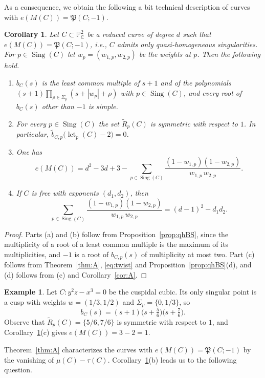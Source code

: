 \documentclass[11pt]{amsart}
\newtheorem{corollary}[theorem]{Corollary}
\theoremstyle{definition}
\newtheorem{example}[theorem]{Example}
\numberwithin{equation}{section}
\newcommand{\PP}{\mathbb{P}}
\newcommand{\CC}{\mathbb{C}}
\newcommand{\Pfrak}{\mathfrak{P}}
\newcommand{\tb}{\widetilde{b}}
\newcommand{\tR}{\widetilde{R}}
\DeclareMathOperator{\Sing}{Sing}
\DeclareMathOperator{\lct}{lct}
\begin{document}
As a consequence, we obtain the following a bit technical description of curves with $e(M(C))=\Pfrak(C;-1)$.

\begin{corollary}\label{cor:ABS}
Let $C\subset\PP^2_\CC$ be a reduced curve of degree $d$ such that $e(M(C))=\Pfrak(C;-1)$, i.e., $C$ admits only quasi-homogeneous singularities.
For $p\in\Sing(C)$ let $w_p=(w_{1,p},w_{2,p})$ be the weights at $p$. Then the following hold.
\begin{enumerate}[label=\textup{(\alph*)},leftmargin=*]
\item $b_C(s)$ is the least common multiple of $s+1$ and of the polynomials $(s+1)\prod_{\rho\in\Sigma_p}(s+|w_p|+\rho)$ with $p\in\Sing(C)$, and every root of $b_C(s)$ other than $-1$ is simple.
\item For every $p\in\Sing(C)$ the set $\tR_p(C)$ is symmetric with respect to $1$. In particular, $\tb_{C,p}\bigl(\lct_p(C)-2\bigr)=0$.
\item One has
\[
e(M(C))=d^2-3d+3-\sum_{p\in\Sing(C)}\frac{(1-w_{1,p})(1-w_{2,p})}{w_{1,p}\,w_{2,p}} .
\]
\item If $C$ is free with exponents $(d_1,d_2)$, then
\[
\sum_{p\in\Sing(C)}\frac{(1-w_{1,p})(1-w_{2,p})}{w_{1,p}\,w_{2,p}}=(d-1)^2-d_1d_2 .
\]
\end{enumerate}
\end{corollary}

\begin{proof}
Parts (a) and (b) follow from Proposition~\ref{prop:qhBS}, since the multiplicity of a root of a least common multiple is the maximum of its multiplicities, and $-1$ is a root of $b_{C,p}(s)$ of multiplicity at most two.
Part (c) follows from Theorem~\ref{thm:A}, \eqref{eq:twist} and Proposition~\ref{prop:qhBS}(d), and (d) follows from (c) and Corollary~\ref{cor:A}.
\end{proof}

\begin{example}
Let $C\colon y^2z-x^3=0$ be the cuspidal cubic.
Its only singular point is a cusp with weights $w=(1/3,1/2)$ and $\Sigma_p=\{0,1/3\}$, so
\[
b_C(s)=(s+1)\bigl(s+\tfrac56\bigr)\bigl(s+\tfrac76\bigr).
\]
Observe that $\tR_p(C)=\{5/6,7/6\}$ is symmetric with respect to $1$, and Corollary~\ref{cor:ABS}(c) gives $e(M(C))=3-2=1$.
\end{example}

Theorem~\ref{thm:A} characterizes the curves with $e(M(C))=\Pfrak(C;-1)$ by the vanishing of $\mu(C)-\tau(C)$.
Corollary~\ref{cor:ABS}(b) leads us to the following question.
\end{document}
